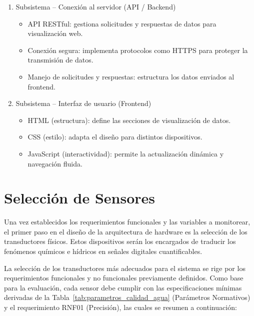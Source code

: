 \begin{enumerate}
    \item Subsistema – Conexión al servidor (API / Backend)
    \begin{itemize}
        \item API RESTful: gestiona solicitudes y respuestas de datos para visualización web.
        \item Conexión segura: implementa protocolos como HTTPS para proteger la transmisión de datos.
        \item Manejo de solicitudes y respuestas: estructura los datos enviados al frontend.
    \end{itemize}

    \item Subsistema – Interfaz de usuario (Frontend)
    \begin{itemize}
        \item HTML (estructura): define las secciones de visualización de datos.
        \item CSS (estilo): adapta el diseño para distintos dispositivos.
        \item JavaScript (interactividad): permite la actualización dinámica y navegación fluida.
    \end{itemize}
\end{enumerate}





%


\section{Selección de Sensores}
\label{sec:analisis_sensores}
Una vez establecidos los requerimientos funcionales y las variables a monitorear, el primer paso en el diseño de la arquitectura de hardware es la selección de los transductores físicos. Estos dispositivos serán los encargados de traducir los fenómenos químicos e hídricos en señales digitales cuantificables.


La selección de los transductores más adecuados para el sistema se rige por los requerimientos funcionales y no funcionales previamente definidos. Como base para la evaluación, cada sensor debe cumplir con las especificaciones mínimas derivadas de la Tabla~\ref{tab:parametros_calidad_agua} (Parámetros Normativos) y el requerimiento RNF01 (Precisión), las cuales se resumen a continuación:

